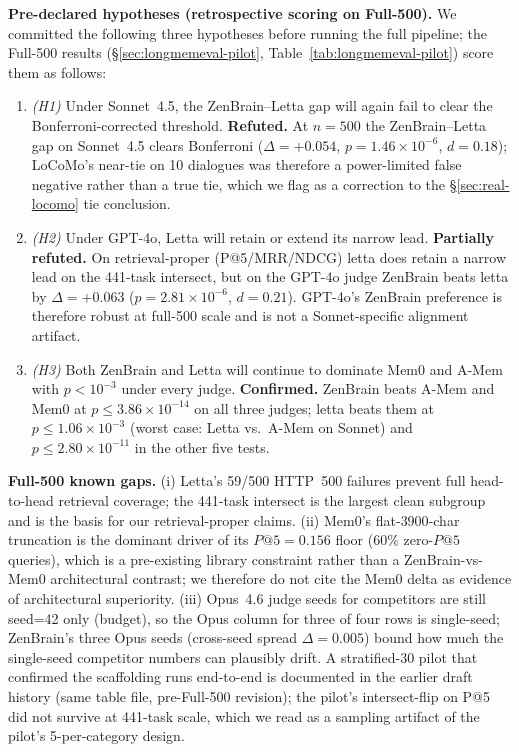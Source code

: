 \documentclass{article}
\begin{document}
\textbf{Pre-declared hypotheses (retrospective scoring on
Full-500).} We committed the following three hypotheses before
running the full pipeline; the Full-500 results
(\S\ref{sec:longmemeval-pilot}, Table~\ref{tab:longmemeval-pilot})
score them as follows:
\begin{enumerate}
\item \emph{(H1)} Under Sonnet~4.5, the ZenBrain--Letta gap
  will again fail to clear the Bonferroni-corrected threshold.
  \textbf{Refuted.} At $n{=}500$ the ZenBrain--Letta gap on
  Sonnet~4.5 clears Bonferroni
  ($\Delta{=}{+}0.054$, $p{=}1.46{\times}10^{-6}$, $d{=}0.18$);
  LoCoMo's near-tie on 10 dialogues was therefore a power-limited
  false negative rather than a true tie, which we flag as a
  correction to the \S\ref{sec:real-locomo} tie conclusion.
\item \emph{(H2)} Under GPT-4o, Letta will retain or extend
  its narrow lead. \textbf{Partially refuted.} On retrieval-proper
  (P@5/MRR/NDCG) letta does retain a narrow lead on the 441-task
  intersect, but on the GPT-4o judge ZenBrain beats letta by
  $\Delta{=}{+}0.063$ ($p{=}2.81{\times}10^{-6}$, $d{=}0.21$).
  GPT-4o's ZenBrain preference is therefore robust at full-500 scale
  and is not a Sonnet-specific alignment artifact.
\item \emph{(H3)} Both ZenBrain and Letta will continue to
  dominate Mem0 and A-Mem with $p < 10^{-3}$
  under every judge. \textbf{Confirmed.} ZenBrain beats
  A-Mem and Mem0 at $p \leq 3.86{\times}10^{-14}$
  on all three judges; letta beats them at $p \leq 1.06{\times}10^{-3}$
  (worst case: Letta vs.\ A-Mem on Sonnet) and $p \leq 2.80{\times}10^{-11}$
  in the other five tests.
\end{enumerate}

\textbf{Full-500 known gaps.} (i) Letta's 59/500 HTTP~500
failures prevent full head-to-head retrieval coverage; the
441-task intersect is the largest clean subgroup and is the basis
for our retrieval-proper claims. (ii) Mem0's
flat-$3900$-char truncation is the dominant driver of its
$P@5{=}0.156$ floor (60\% zero-$P@5$ queries), which is a
pre-existing library constraint rather than a ZenBrain-vs-Mem0
architectural contrast; we therefore do not cite the Mem0 delta as
evidence of architectural superiority. (iii) Opus~4.6 judge seeds
for competitors are still seed=42 only (budget), so the Opus column
for three of four rows is single-seed; ZenBrain's three Opus seeds
(cross-seed spread $\Delta{=}0.005$) bound how much the single-seed
competitor numbers can plausibly drift.
A stratified-30 pilot that confirmed the scaffolding runs end-to-end
is documented in the earlier draft history (same table file,
pre-Full-500 revision); the pilot's intersect-flip on P@5 did not
survive at 441-task scale, which we read as a sampling artifact of
the pilot's 5-per-category design.
\end{document}
